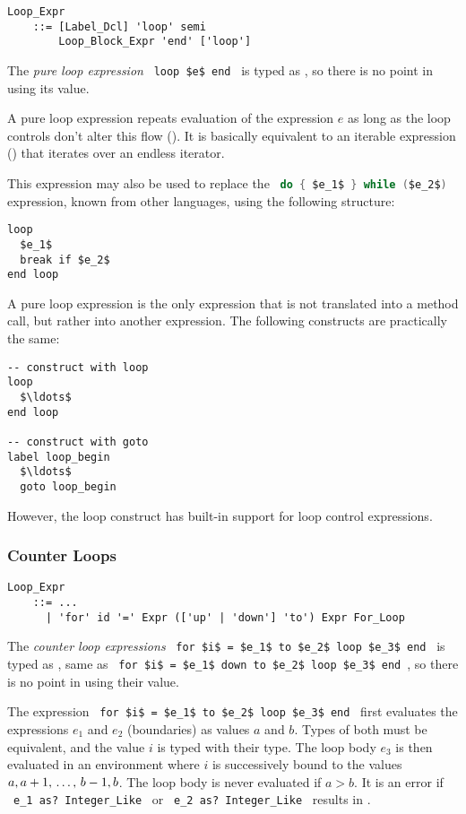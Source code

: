\grammar\begin{lstlisting}
Loop_Expr 
    ::= [Label_Dcl] 'loop' semi 
        Loop_Block_Expr 'end' ['loop']
\end{lstlisting}

The {\em pure loop expression} ~\lstinline!loop $e$ end!~ is typed as , so there is no point in using its value. 

A pure loop expression repeats evaluation of the expression $e$ as long as the loop controls don't alter this flow (). It is basically equivalent to an iterable expression () that iterates over an endless iterator. 

This expression may also be used to replace the ~\lstinline[language=Java]!do { $e_1$ } while ($e_2$)!~ expression, known from other languages, using the following structure: 
\begin{lstlisting}
loop
  $e_1$
  break if $e_2$
end loop
\end{lstlisting}

A pure loop expression is the only expression that is not translated into a method call, but rather into another expression. The following constructs are practically the same: 
\begin{lstlisting}
-- construct with loop
loop
  $\ldots$
end loop

-- construct with goto
label loop_begin
  $\ldots$
  goto loop_begin
\end{lstlisting}
However, the loop construct has built-in support for loop control expressions. 





\subsubsection{Counter Loops}

\grammar\begin{lstlisting}
Loop_Expr 
    ::= ...
      | 'for' id '=' Expr (['up' | 'down'] 'to') Expr For_Loop
\end{lstlisting}

The {\em counter loop expressions} ~\lstinline!for $i$ = $e_1$ to $e_2$ loop $e_3$ end!~ is typed as , same as ~\lstinline!for $i$ = $e_1$ down to $e_2$ loop $e_3$ end!~, so there is no point in using their value. 

The expression ~\lstinline!for $i$ = $e_1$ to $e_2$ loop $e_3$ end!~ first evaluates the expressions $e_1$ and $e_2$ (boundaries) as  values $a$ and $b$. Types of both must be equivalent, and the value $i$ is typed with their type. The loop body $e_3$ is then evaluated in an environment where $i$ is successively bound to the values $a, a+1 ,\, \ldots ,\, b-1, b$. The loop body is never evaluated if $a > b$. It is an error if ~\lstinline!e_1 as? Integer_Like!~ or ~\lstinline!e_2 as? Integer_Like!~ results in . 

